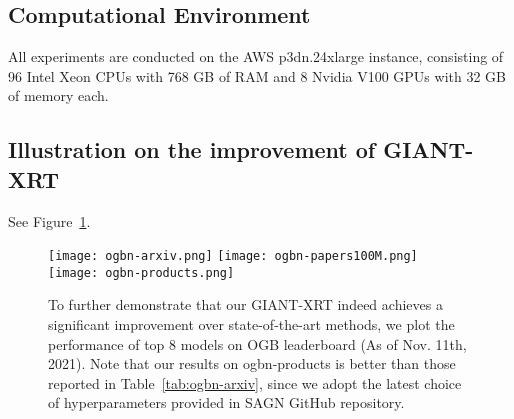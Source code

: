 \documentclass{article} \usepackage{iclr2022_conference,times}
\begin{document}
\subsection{Computational Environment}
All experiments are conducted on the AWS p3dn.24xlarge instance, consisting of
96 Intel Xeon CPUs with 768 GB of RAM and 8 Nvidia V100 GPUs with 32 GB of memory each.

\subsection{Illustration on the improvement of GIANT-XRT}\label{app:improvement}
See Figure~\ref{fig:improvement}.
\begin{figure}[h]
\centering
  \texttt{[image: ogbn-arxiv.png]}
  \texttt{[image: ogbn-papers100M.png]}
  \texttt{[image: ogbn-products.png]}
\caption{To further demonstrate that our GIANT-XRT indeed achieves a significant improvement over state-of-the-art methods, we plot the performance of top 8 models on OGB leaderboard (As of Nov. 11th, 2021). Note that our results on ogbn-products is better than those reported in Table~\ref{tab:ogbn-arxiv}, since we adopt the latest choice of hyperparameters provided in SAGN GitHub repository.}\label{fig:improvement}
\vspace{-0.1in}
\end{figure}
\end{document}
